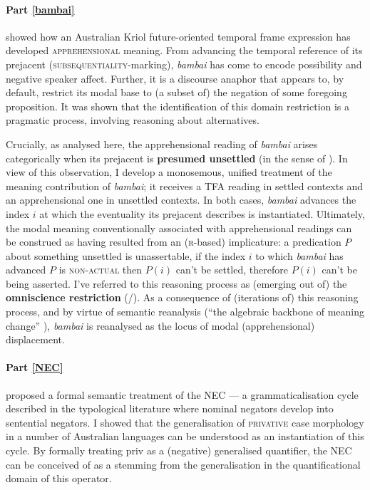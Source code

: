 \documentclass[11pt,dvipsnames]{report}
\begin{document}
\paragraph{Part \textbf{\ref{bambai}}} showed how an Australian Kriol future-oriented temporal frame expression has developed \textsc{apprehensional} meaning. From advancing the temporal reference of its prejacent (\textsc{subseq\-uentiality}-marking), \textit{bambai} has come to encode possibility and negative speaker affect. Further, it is a discourse anaphor that appears to, by default, restrict its modal base to (a subset of) the negation of some foregoing proposition. It was shown that the identification of this domain restriction is a pragmatic process, involving reasoning about alternatives.

Crucially, as analysed here, the apprehensional reading of \textit{bambai} arises categorically when its prejacent is \textbf{presumed unsettled} (in the sense of \citealp{Condoravdi2002}). In view of this observation, I develop a monosemous, unified treatment of the meaning contribution of \textit{bambai}; it receives a \acrlong{TFA} reading in settled contexts and an apprehensional one in unsettled contexts. In both cases, \textit{bambai} advances the index $ i $ at which the eventuality its prejacent describes is instantiated. Ultimately, the modal meaning conventionally associated with apprehensional readings can be construed as having resulted from an (\textsc{r}-based) implicature: a predication $ P $ about something unsettled is unassertable, if the index $ i $ to which \textit{bambai} has advanced $ P $ is \textsc{non-actual} then $ P(i) $ can't be settled, therefore $ P(i) $ can't be being asserted. I've referred to this reasoning process as (emerging out of) the \textbf{omniscience restriction} (/). As a consequence of (iterations of) this reasoning process, and by virtue of semantic reanalysis (``the algebraic backbone of meaning change'' \citep{Eckardt2006}), \textit{bambai} is reanalysed as the locus of modal (apprehensional) displacement.
\paragraph{Part \textbf{\ref{NEC}}} proposed a formal semantic treatment of the \acrlong{NEC} --- a grammaticalisation cycle described in the typological literature where nominal negators develop into sentential negators. I showed that the generalisation of \textsc{privative} case morphology in a number of Australian languages can be understood as an instantiation of this cycle. By formally treating \gls{priv} as a (negative) generalised quantifier, the \acrshort{NEC} can be conceived of as a stemming from the generalisation in the quantificational domain of this operator.
\end{document}
